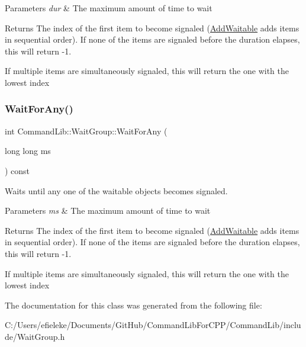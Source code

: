 \begin{DoxyParams}{Parameters}
{\em dur} & The maximum amount of time to wait\\
\hline
\end{DoxyParams}
\begin{DoxyReturn}{Returns}
The index of the first item to become signaled (\mbox{\hyperlink{class_command_lib_1_1_wait_group_a2ad37bdf4b472ad67c660ceb2a9ca0c9}{Add\+Waitable}} adds items in sequential order). If none of the items are signaled before the duration elapses, this will return -\/1. 

If multiple items are simultaneously signaled, this will return the one with the lowest index 
\end{DoxyReturn}
\mbox{\label{class_command_lib_1_1_wait_group_a8c31c5a9acfaf1df818d22919a976ee2}} 
\subsubsection{\texorpdfstring{Wait\+For\+Any()}{WaitForAny()}\hspace{0.1cm}{\footnotesize\ttfamily [3/3]}}
{\footnotesize\ttfamily int Command\+Lib\+::\+Wait\+Group\+::\+Wait\+For\+Any (\begin{DoxyParamCaption}\item[{long long}]{ms }\end{DoxyParamCaption}) const}



Waits until any one of the waitable objects becomes signaled.


\begin{DoxyParams}{Parameters}
{\em ms} & The maximum amount of time to wait\\
\hline
\end{DoxyParams}
\begin{DoxyReturn}{Returns}
The index of the first item to become signaled (\mbox{\hyperlink{class_command_lib_1_1_wait_group_a2ad37bdf4b472ad67c660ceb2a9ca0c9}{Add\+Waitable}} adds items in sequential order). If none of the items are signaled before the duration elapses, this will return -\/1. 
\end{DoxyReturn}


If multiple items are simultaneously signaled, this will return the one with the lowest index 

The documentation for this class was generated from the following file\+:\begin{DoxyCompactItemize}
\item 
C\+:/\+Users/efieleke/\+Documents/\+Git\+Hub/\+Command\+Lib\+For\+C\+P\+P/\+Command\+Lib/include/Wait\+Group.\+h\end{DoxyCompactItemize}
